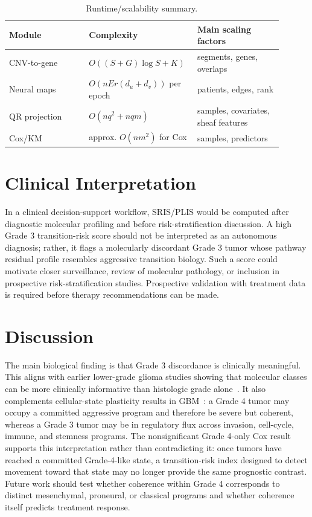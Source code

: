 \documentclass[conference]{IEEEtran}
\begin{document}
\begin{table}[t]
\caption{Runtime/scalability summary.}
\label{tab:runtime}
\centering
\begin{tabular}{p{0.28\linewidth}p{0.32\linewidth}p{0.30\linewidth}}
\toprule
Module & Complexity & Main scaling factors \\
\midrule
CNV-to-gene & $O((S+G)\log S+K)$ & segments, genes, overlaps \\
Neural maps & $O(nEr(d_u+d_v))$ per epoch & patients, edges, rank \\
QR projection & $O(nq^2+nqm)$ & samples, covariates, sheaf features \\
Cox/KM & approx. $O(nm^2)$ for Cox & samples, predictors \\
\bottomrule
\end{tabular}
\end{table}

\section{Clinical Interpretation}
In a clinical decision-support workflow, SRIS/PLIS would be computed after diagnostic molecular profiling and before risk-stratification discussion. A high Grade 3 transition-risk score should not be interpreted as an autonomous diagnosis; rather, it flags a molecularly discordant Grade 3 tumor whose pathway residual profile resembles aggressive transition biology. Such a score could motivate closer surveillance, review of molecular pathology, or inclusion in prospective risk-stratification studies. Prospective validation with treatment data is required before therapy recommendations can be made.

\section{Discussion}
The main biological finding is that Grade 3 discordance is clinically meaningful. This aligns with earlier lower-grade glioma studies showing that molecular classes can be more clinically informative than histologic grade alone~\cite{brat2015,ceccarelli2016}. It also complements cellular-state plasticity results in GBM~\cite{neftel2019}: a Grade 4 tumor may occupy a committed aggressive program and therefore be severe but coherent, whereas a Grade 3 tumor may be in regulatory flux across invasion, cell-cycle, immune, and stemness programs. The nonsignificant Grade 4-only Cox result supports this interpretation rather than contradicting it: once tumors have reached a committed Grade-4-like state, a transition-risk index designed to detect movement toward that state may no longer provide the same prognostic contrast. Future work should test whether coherence within Grade 4 corresponds to distinct mesenchymal, proneural, or classical programs and whether coherence itself predicts treatment response.
\end{document}
